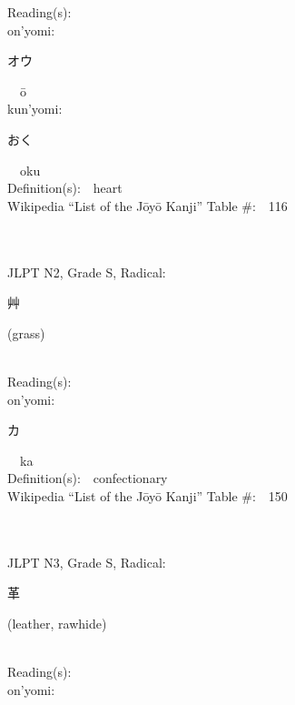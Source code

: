 \begin{multicols}{2}
Reading(s):\ \ \\
{\hspace*{1em}}on'yomi:\ \ \\
{\hspace*{2em}}{\begin{CJK}{UTF8}{min} オウ \end{CJK}}\ \ \=o\ \ \\
{\hspace*{1em}}kun'yomi:\ \ \\
{\hspace*{2em}}{\begin{CJK}{UTF8}{min} おく \end{CJK}}\ \ oku\ \ \\
Definition(s):\ \ heart \\
Wikipedia ``List of the J\=oy\=o Kanji'' Table \#:\ \ 116 \\
\ \ \\
{\fontsize{34pt}{40pt}  }\ \ \\  %
{JLPT N2, Grade S, Radical:\ \ {\begin{CJK}{UTF8}{min} 艸 \end{CJK}} (grass) } \\
Reading(s):\ \ \\
{\hspace*{1em}}on'yomi:\ \ \\
{\hspace*{2em}}{\begin{CJK}{UTF8}{min} カ \end{CJK}}\ \ ka\ \ \\
Definition(s):\ \ confectionary \\
Wikipedia ``List of the J\=oy\=o Kanji'' Table \#:\ \ 150 \\
\ \ \\
{\fontsize{34pt}{40pt}  }\ \ \\  %
{JLPT N3, Grade S, Radical:\ \ {\begin{CJK}{UTF8}{min} 革 \end{CJK}} (leather, rawhide) } \\
Reading(s):\ \ \\
{\hspace*{1em}}on'yomi:\ \ \\

\end{multicols}

